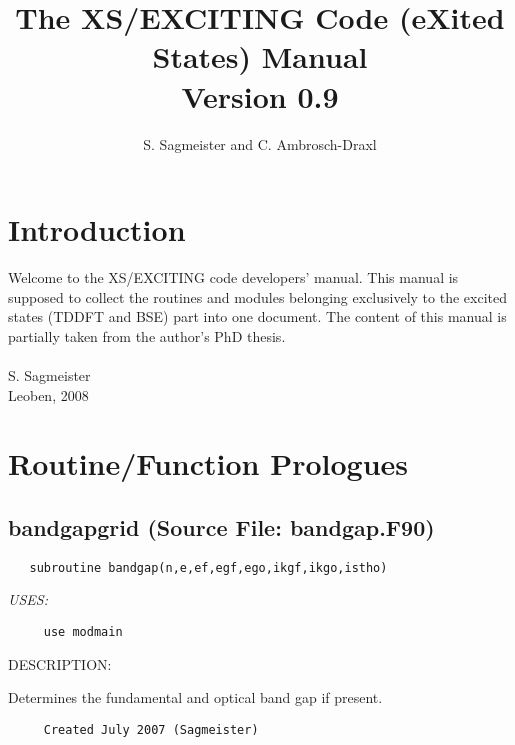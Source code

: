 \documentclass[11pt]{article}
\title{The XS/EXCITING Code (eXited States) Manual \\ Version 0.9}
\author{{\sc S. Sagmeister and C. Ambrosch-Draxl}\\ {\em }}
\date{}
\begin{document}
\maketitle
\tableofcontents
\newpage
 
\section{Introduction}

     Welcome to the {\sf XS/EXCITING} code developers' manual.
     This manual is supposed to collect the routines and modules belonging
     exclusively to the excited states (TDDFT and BSE) part into one document.
     The content of this manual is partially taken from the author's PhD thesis.
     \\\\
     S. Sagmeister\\
     Leoben, 2008
   
\newpage


 
\section{Routine/Function Prologues} \label{app:ProLogues}
\subsection{bandgapgrid (Source File: bandgap.F90)}


\begin{verbatim}   subroutine bandgap(n,e,ef,egf,ego,ikgf,ikgo,istho)\end{verbatim}{\em USES:}
\begin{verbatim}     use modmain\end{verbatim}
{\sf DESCRIPTION:\\ }


     Determines the fundamental and optical band gap if present.
  
\begin{verbatim}     Created July 2007 (Sagmeister)\end{verbatim}

\end{document}
